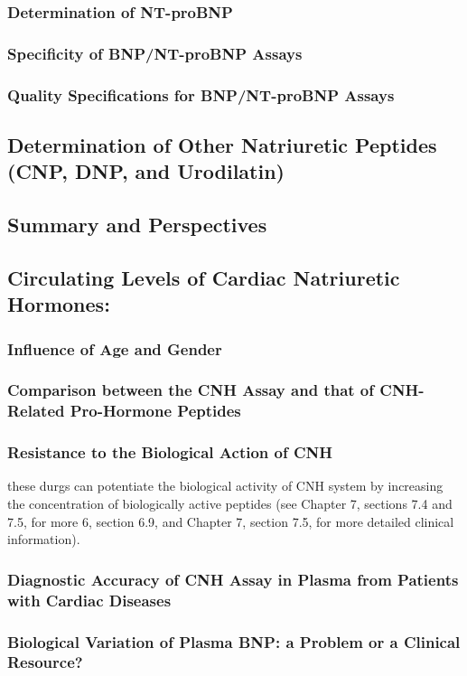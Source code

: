 {{{{{{{{{\subsubsection{ Determination of NT-proBNP}
\subsubsection{ Specificity of BNP/NT-proBNP Assays}
\subsubsection{ Quality Specifications for BNP/NT-proBNP Assays}
\subsection{ Determination of Other Natriuretic Peptides (CNP, DNP, and Urodilatin)}
\subsection{ Summary and Perspectives}
\subsection{ Circulating Levels of Cardiac Natriuretic Hormones:}
\subsubsection{ Influence of Age and Gender}
\subsubsection{ Comparison between the CNH Assay and that of CNH-Related Pro-Hormone Peptides}
\subsubsection{ Resistance to the Biological Action of CNH}
these durgs can potentiate the biological activity of CNH system by increasing the concentration of biologically active peptides \citep{bib339} \citep{bib340} \citep{bib341} \citep{bib342} (see Chapter 7, sections 7.4 and 7.5, for more
6, section 6.9, and Chapter 7, section 7.5, for more detailed clinical information).
\subsubsection{ Diagnostic Accuracy of CNH Assay in Plasma from Patients with Cardiac Diseases}
\subsubsection{ Biological Variation of Plasma BNP: a Problem or a Clinical Resource?}
}}}}}}}}}
